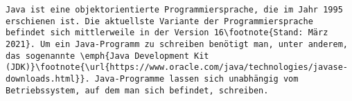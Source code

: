 \begin{verbatim}
Java ist eine objektorientierte Programmiersprache, die im Jahr 1995 erschienen ist. Die aktuellste Variante der Programmiersprache befindet sich mittlerweile in der Version 16\footnote{Stand: März 2021}. Um ein Java-Programm zu schreiben benötigt man, unter anderem, das sogenannte \emph{Java Development Kit (JDK)}\footnote{\url{https://www.oracle.com/java/technologies/javase-downloads.html}}. Java-Programme lassen sich unabhängig vom Betriebssystem, auf dem man sich befindet, schreiben.
\end{verbatim}

	
